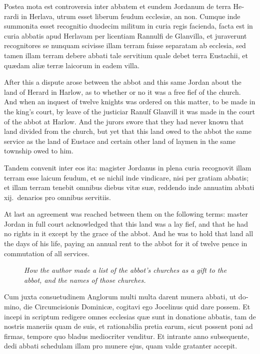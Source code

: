 \documentclass{book}
\newcommand{\blockhead}[4][]{
\begin{figure}
\centering
\vspace{#4}
\parbox{2.75cm}{\begin{center}\footnotesize \color{BrickRed} \emph{#2}\\ #1 \end{center}}
\end{figure}
}
\begin{document}
\begin{paracol}{2}
\switchcolumn*

\begin{otherlanguage}{latin}
Postea mota est controversia inter abbatem et eundem Jordanum de terra Herardi in Herlava, utrum esset liberum feudum ecclesi\ae{}, an non. Cumque inde summonita esset recognitio duodecim militum in curia regis facienda, facta est in curia abbatis apud Herlavam per licentiam Rannulfi de Glanvilla, et juraverunt recognitores se nunquam scivisse illam terram fuisse separatam ab ecclesia, sed tamen illam terram debere abbati tale servitium quale debet terra Eustachii, et qu\ae{}dam ali\ae{} terr\ae{} laicorum in eadem villa. 
\end{otherlanguage}

\switchcolumn

After this a dispute arose between the abbot and this same Jordan about the land of Herard in Harlow, as to whether or no it was a free fief of the church. And when an inquest of twelve knights was ordered on this matter, to be made in the king's court, by leave of the justiciar Ranulf Glanvill it was made in the court of the abbot at Harlow. And the jurors swore that they had never known that land divided from the church, but yet that this land owed to the abbot the same service as the land of Eustace and certain other land of laymen in the same township owed to him.

\switchcolumn*

\begin{otherlanguage}{latin}
Tandem convenit inter eos ita: magister Jordanus in plena curia recognovit illam terram esse laicum feudum, et se nichil inde vindicare, nisi per gratiam abbatis; et illam terram tenebit omnibus diebus vit\ae{} su\ae{}, reddendo inde annuatim abbati xij.\ denarios pro omnibus servitiis.
\end{otherlanguage}

\switchcolumn

At last an agreement was reached between them on the following terms: master Jordan in full court acknowledged that this land was a lay fief, and that he had no rights in it except by the grace of the abbot. And he was to hold that land all the days of his life, paying an annual rent to the abbot for it of twelve pence in commutation of all services.

\switchcolumn*

\begin{otherlanguage}{latin}
\blockhead{How the author made a list of the abbot's churches as a gift to the abbot, and the names of those churches.}{4}{-.65cm}
Cum juxta consuetudinem Anglorum multi multa darent munera abbati, ut domino, die Circumcisionis Dominic\ae{}, cogitavi ego Jocelinus quid dare possem. Et incepi in scriptum redigere omnes ecclesias qu\ae{} sunt in donatione abbatis, tam de nostris maneriis  quam de suis, et rationabilia pretia earum, sicut possent poni ad firmas, tempore quo bladus mediocriter venditur. Et intrante anno subsequente, dedi abbati schedulam illam pro munere ejus, quam valde gratanter accepit.


\end{otherlanguage}
\end{paracol}
\end{document}
